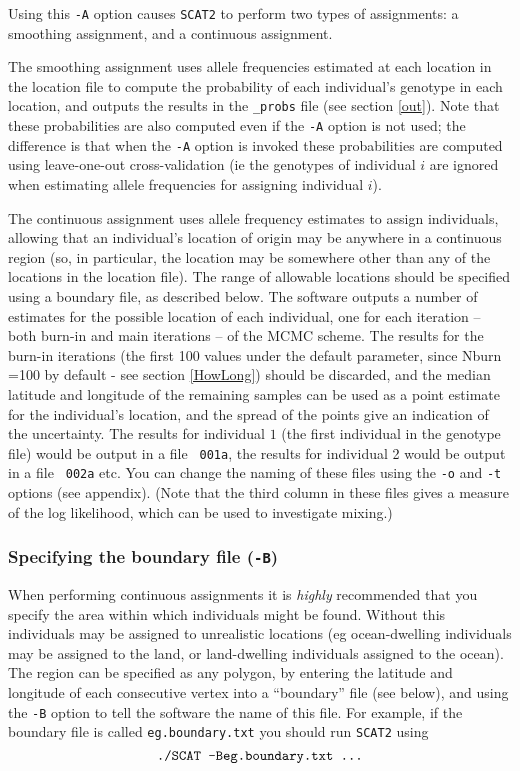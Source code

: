 \documentclass[11pt,titlepage,times,letterpaper]{article}
\def\SCAT{{\tt SCAT2} }
\begin{document}
Using this {\tt -A} option causes \SCAT to perform two types of
assignments: a smoothing assignment, and a continuous assignment.  

The smoothing assignment uses allele frequencies estimated at each
location in the location file to compute the probability of each
individual's genotype in each location, and outputs the results in the
{\tt \_probs} file (see section \ref{out}). Note that these
probabilities are also computed even if the {\tt -A} option is not
used; the difference is that when the {\tt -A} option is invoked these
probabilities are computed using leave-one-out cross-validation (ie
the genotypes of individual $i$ are ignored when estimating allele
frequencies for assigning individual $i$).

The continuous assignment uses allele frequency estimates to assign
individuals, allowing that an individual's location of origin may be
anywhere in a continuous region (so, in particular, the location may
be somewhere other than any of the locations in the location
file). The range of allowable locations should be specified using a
boundary file, as described below. The software outputs a number of
estimates for the possible location of each individual, one for each
iteration -- both burn-in and main iterations -- of the MCMC
scheme. The results for the burn-in iterations (the first 100 values
under the default parameter, since Nburn =100 by default - see section
\ref{HowLong}) should be discarded, and the median latitude and
longitude of the remaining samples can be used as a point estimate for
the individual's location, and the spread of the points give an
indication of the uncertainty. The results for individual $1$ (the
first individual in the genotype file) would be output in a file {\tt
001a}, the results for individual 2 would be output in a file {\tt
002a} etc. You can change the naming of these files using the {\tt -o}
and {\tt -t} options (see appendix). (Note that the third column in
these files gives a measure of the log likelihood, which can be
used to investigate mixing.)


\subsubsection{Specifying the boundary file ({\tt -B})} \label{boundary}

When performing continuous assignments it is {\it highly}
recommended that you specify the area within which individuals might
be found. Without this individuals may be assigned to unrealistic
locations (eg ocean-dwelling individuals may be assigned to the land,
or land-dwelling individuals assigned to the ocean). The region can be
specified as any polygon, by entering the latitude and longitude of
each consecutive vertex into a ``boundary'' file (see below), and using
the {\tt -B} option to tell the software the name of this file.
For example, if the boundary file is called {\tt eg.boundary.txt} you
should run \SCAT using
$$\text{\tt ./SCAT -Beg.boundary.txt ...}$$ 
\end{document}
